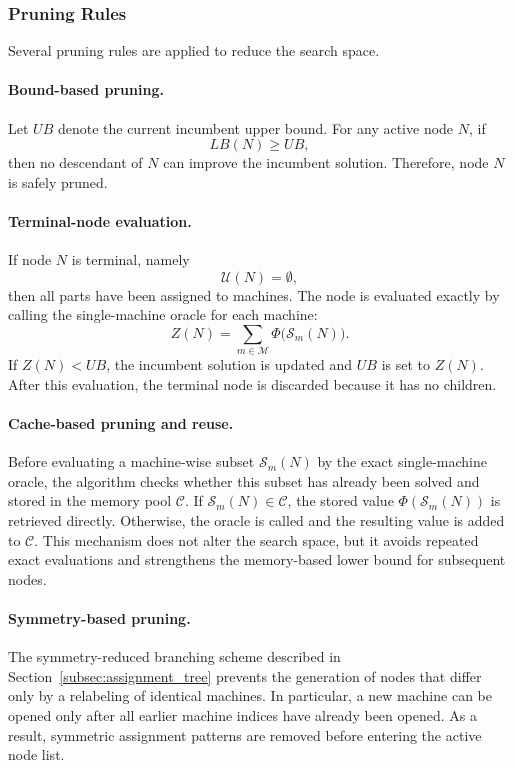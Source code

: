 \documentclass[letterpaper, 10 pt, conference]{ieeeconf}  %
\begin{document}
\subsubsection{Pruning Rules}

Several pruning rules are applied to reduce the search space.

\paragraph*{Bound-based pruning.}
Let $UB$ denote the current incumbent upper bound. For any active node $N$,
if
\[
LB(N)\ge UB,
\]
then no descendant of $N$ can improve the incumbent solution. Therefore,
node $N$ is safely pruned.

\paragraph*{Terminal-node evaluation.}
If node $N$ is terminal, namely
\[
\mathcal{U}(N)=\emptyset,
\]
then all parts have been assigned to machines. The node is evaluated exactly
by calling the single-machine oracle for each machine:
\[
Z(N)=
\sum_{m\in\mathcal{M}}
\Phi\bigl(\mathcal{S}_m(N)\bigr).
\]
If $Z(N)<UB$, the incumbent solution is updated and $UB$ is set to $Z(N)$.
After this evaluation, the terminal node is discarded because it has no
children.

\paragraph*{Cache-based pruning and reuse.}
Before evaluating a machine-wise subset $\mathcal{S}_m(N)$ by the exact
single-machine oracle, the algorithm checks whether this subset has already
been solved and stored in the memory pool $\mathcal{C}$. If
$\mathcal{S}_m(N)\in\mathcal{C}$, the stored value
$\Phi(\mathcal{S}_m(N))$ is retrieved directly. Otherwise, the oracle is
called and the resulting value is added to $\mathcal{C}$. This mechanism
does not alter the search space, but it avoids repeated exact evaluations
and strengthens the memory-based lower bound for subsequent nodes.

\paragraph*{Symmetry-based pruning.}
The symmetry-reduced branching scheme described in
Section~\ref{subsec:assignment_tree} prevents the generation of nodes that
differ only by a relabeling of identical machines. In particular, a new
machine can be opened only after all earlier machine indices have already
been opened. As a result, symmetric assignment patterns are removed before
entering the active node list.
\end{document}
